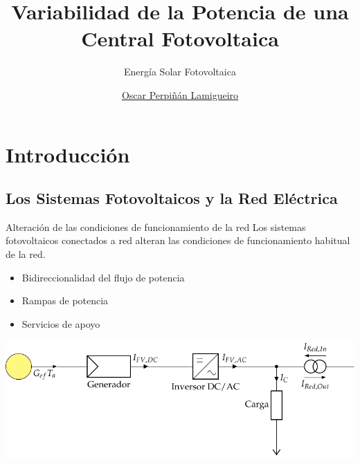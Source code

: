 \documentclass[aspectratio=169, usenames,svgnames,dvipsnames]{beamer}
\author{\href{https://oscarperpinan.github.io}{Oscar Perpiñán Lamigueiro}}
\date{}
\title{Variabilidad de la Potencia de una Central Fotovoltaica}
\subtitle{Energía Solar Fotovoltaica}
\institute[UPM]{Universidad Politécnica de Madrid}
\begin{document}
\maketitle

\section{Introducción}
\label{sec:org7795e04}

\subsection{Los Sistemas Fotovoltaicos y la Red Eléctrica}
\label{sec:orga0da1a7}

\begin{frame}[label={sec:org9dd7afd}]{Alteración de las condiciones de funcionamiento de la red}
Los sistemas fotovoltaicos conectados a red alteran las condiciones de
funcionamiento habitual de la red.

\begin{itemize}
\item Bidireccionalidad del flujo de potencia
\item Rampas de potencia
\item Servicios de apoyo
\end{itemize}

\begin{center}
\includegraphics[width=\textwidth]{../figs/SFCR_bidireccional.pdf}
\end{center}
\end{frame}
\end{document}
